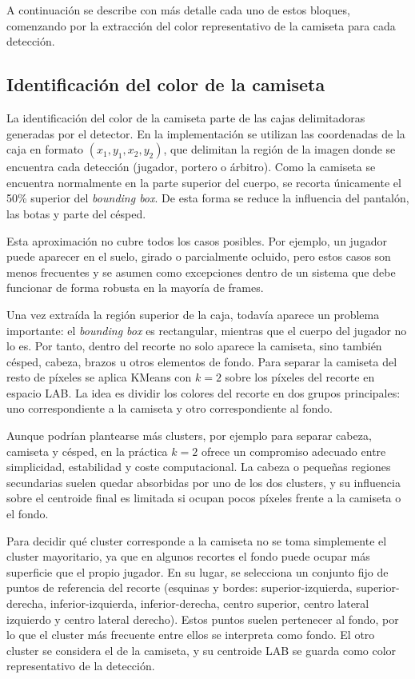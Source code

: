 A continuación se describe con más detalle cada uno de estos bloques, comenzando por la extracción del color representativo de la camiseta para cada detección.

\subsection{Identificación del color de la camiseta}

La identificación del color de la camiseta parte de las cajas delimitadoras generadas por el detector. En la implementación se utilizan las coordenadas de la caja en formato $(x_1, y_1, x_2, y_2)$, que delimitan la región de la imagen donde se encuentra cada detección (jugador, portero o árbitro). Como la camiseta se encuentra normalmente en la parte superior del cuerpo, se recorta únicamente el 50\% superior del \textit{bounding box}. De esta forma se reduce la influencia del pantalón, las botas y parte del césped.

Esta aproximación no cubre todos los casos posibles. Por ejemplo, un jugador puede aparecer en el suelo, girado o parcialmente ocluido, pero estos casos son menos frecuentes y se asumen como excepciones dentro de un sistema que debe funcionar de forma robusta en la mayoría de frames.

Una vez extraída la región superior de la caja, todavía aparece un problema importante: el \textit{bounding box} es rectangular, mientras que el cuerpo del jugador no lo es. Por tanto, dentro del recorte no solo aparece la camiseta, sino también césped, cabeza, brazos u otros elementos de fondo. Para separar la camiseta del resto de píxeles se aplica KMeans con $k=2$ sobre los píxeles del recorte en espacio LAB. La idea es dividir los colores del recorte en dos grupos principales: uno correspondiente a la camiseta y otro correspondiente al fondo.

Aunque podrían plantearse más clusters, por ejemplo para separar cabeza, camiseta y césped, en la práctica $k=2$ ofrece un compromiso adecuado entre simplicidad, estabilidad y coste computacional. La cabeza o pequeñas regiones secundarias suelen quedar absorbidas por uno de los dos clusters, y su influencia sobre el centroide final es limitada si ocupan pocos píxeles frente a la camiseta o el fondo.

Para decidir qué cluster corresponde a la camiseta no se toma simplemente el cluster mayoritario, ya que en algunos recortes el fondo puede ocupar más superficie que el propio jugador. En su lugar, se selecciona un conjunto fijo de puntos de referencia del recorte (esquinas y bordes: superior-izquierda, superior-derecha, inferior-izquierda, inferior-derecha, centro superior, centro lateral izquierdo y centro lateral derecho). Estos puntos suelen pertenecer al fondo, por lo que el cluster más frecuente entre ellos se interpreta como fondo. El otro cluster se considera el de la camiseta, y su centroide LAB se guarda como color representativo de la detección.

